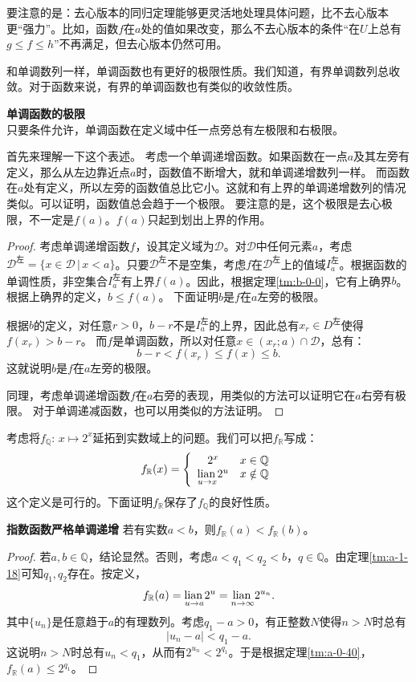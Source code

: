 \documentclass[12pt,UTF8]{ctexbook}
\begin{document}
\begin{appendix}
要注意的是：去心版本的同归定理能够更灵活地处理具体问题，比不去心版本更“强力”。比如，函数$f$在$a$处的值如果改变，那么不去心版本的条件“在$U$上总有$g \leqslant f \leqslant h $”不再满足，但去心版本仍然可用。

和单调数列一样，单调函数也有更好的极限性质。我们知道，有界单调数列总收敛。对于函数来说，有界的单调函数也有类似的收敛性质。
\begin{tm}{\textbf{单调函数的极限}}\label{tm:b-0-30}\\
    只要条件允许，单调函数在定义域中任一点旁总有左极限和右极限。
\end{tm}
首先来理解一下这个表述。
考虑一个单调递增函数。如果函数在一点$a$及其左旁有定义，那么从左边靠近点$a$时，函数值不断增大，就和单调递增数列一样。
而函数在$a$处有定义，所以左旁的函数值总比它小。这就和有上界的单调递增数列的情况类似。可以证明，函数值总会趋于一个极限。
要注意的是，这个极限是去心极限，不一定是$f(a)$。$f(a)$只起到划出上界的作用。
\begin{proof}
    考虑单调递增函数$f$，设其定义域为$\mathcal{D}$。对$\mathcal{D}$中任何元素$a$，考虑$\mathcal{D}^{\text{左}} = \{x\in\mathcal{D} \, | \, x < a\}$。只要$\mathcal{D}^{\text{左}}$不是空集，考虑$f$在$\mathcal{D}^{\text{左}}$上的值域$I_a^{\text{左}}$。根据函数的单调性质，非空集合$I_a^{\text{左}}$有上界$f(a)$。因此，根据定理\ref{tm:b-0-0}，它有上确界$b$。根据上确界的定义，$b\leqslant f(a)$。
    下面证明$b$是$f$在$a$左旁的极限。

    根据$b$的定义，对任意$r>0$，$b - r$不是$I_a^{\text{左}}$的上界，因此总有$x_r\in D^{\text{左}}$使得$f(x_r)>b-r$。
    而$f$是单调函数，所以对任意$x\in(x_r;a)\cap\mathcal{D}$，总有：
    $$ b - r < f(x_r) \leqslant f(x) \leqslant b.$$
    这就说明$b$是$f$在$a$左旁的极限。 

    同理，考虑单调递增函数$f$在$a$右旁的表现，用类似的方法可以证明它在$a$右旁有极限。
    对于单调递减函数，也可以用类似的方法证明。
\end{proof}

考虑将$f_{\mathbb{Q}}:\,x\mapsto 2^x$延拓到实数域上的问题。我们可以把$f_{\mathbb{R}}$写成：
$$
    f_{\mathbb{R}} (x) = \left\{\begin{array}[]{cc}
        2^x & x\in\mathbb{Q} \\
        \lian{u \to x} 2^u & x \notin \mathbb{Q}
    \end{array}\right.
$$
这个定义是可行的。下面证明$f_{\mathbb{R}}$保存了$f_{\mathbb{Q}}$的良好性质。

\begin{tm}{\textbf{指数函数严格单调递增}}
    若有实数$a<b$，则$f_{\mathbb{R}} (a) < f_{\mathbb{R}}(b)$。
\end{tm}
\begin{proof}
    若$a,b\in\mathbb{Q}$，结论显然。否则，考虑$a<q_1<q_2<b$，$q\in\mathbb{Q}$。由定理\ref{tm:a-1-18}可知$q_1,q_2$存在。按定义，
    $$ f_{\mathbb{R}} (a) = \underset{u \to a}{\operatorname{lian}\,} 2^u = \underset{n\to\infty}{\operatorname{lian}\,} 2^{u_n}. $$
    其中$\{u_n\}$是任意趋于$a$的有理数列。考虑$q_1-a>0$，有正整数$N$使得$n>N$时总有
    $$ |u_n - a| < q_1 - a.$$
    这说明$n>N$时总有$u_n < q_1$，从而有$2^{u_n} < 2^{q_1}$。于是根据定理\ref{tm:a-0-40}，$f_{\mathbb{R}} (a)\leqslant 2^{q_1}$。


\end{proof}
\end{appendix}
\end{document}
